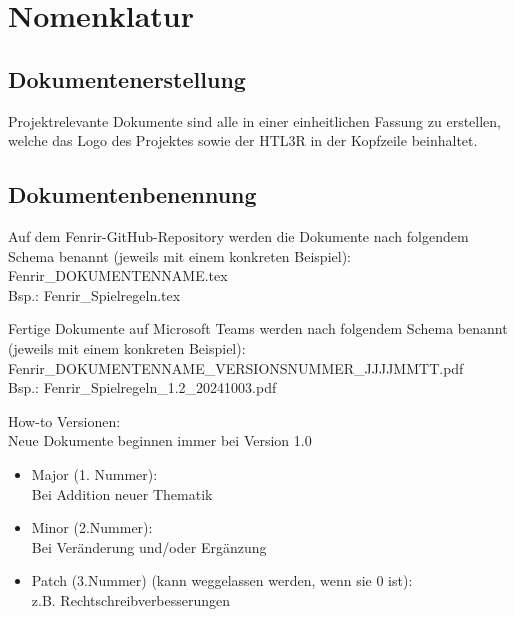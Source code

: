 \documentclass[
	headings=optiontotocandhead,%
	oneside,
	numbers=noenddot,%
	toc=flat, %
	10pt, %
	parskip=full, %
	listof=totoc, %
	listof=flat, %
	numbers=noenddot, %
	bibliography=totoc, %
	a4paper,DIV=14,
]{scrartcl}
\begin{document}
\section{Nomenklatur}
\subsection{Dokumentenerstellung}
Projektrelevante Dokumente sind alle in einer einheitlichen Fassung zu erstellen, welche das Logo des Projektes sowie der HTL3R in der Kopfzeile beinhaltet.

\subsection{Dokumentenbenennung}
Auf dem Fenrir-GitHub-Repository werden die Dokumente nach folgendem Schema benannt (jeweils mit einem konkreten Beispiel): \\
Fenrir\_DOKUMENTENNAME.tex \\
Bsp.: Fenrir\_Spielregeln.tex

Fertige Dokumente auf Microsoft Teams werden nach folgendem Schema benannt (jeweils mit einem konkreten Beispiel): \\
Fenrir\_DOKUMENTENNAME\_VERSIONSNUMMER\_JJJJMMTT.pdf \\
Bsp.: Fenrir\_Spielregeln\_1.2\_20241003.pdf

How-to Versionen:\\
Neue Dokumente beginnen immer bei Version 1.0
\begin{itemize}
\item{Major (1. Nummer):}\\
Bei Addition neuer Thematik

\item{Minor (2.Nummer):}\\
Bei Veränderung und/oder Ergänzung

\item{Patch (3.Nummer) (kann weggelassen werden, wenn sie 0 ist):}\\
z.B. Rechtschreibverbesserungen
\end{itemize}
\end{document}
